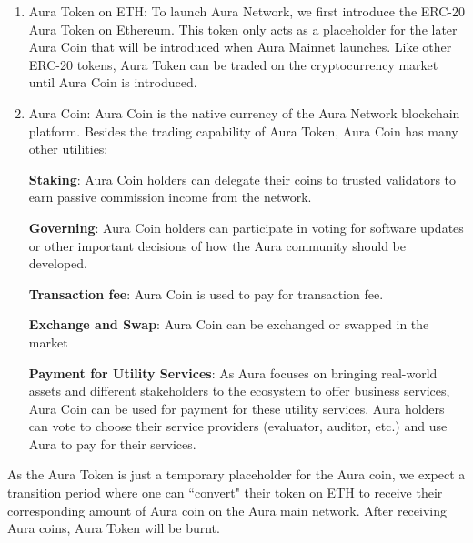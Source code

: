 \documentclass[12pt]{article}
\begin{document}
\begin{enumerate}
    \item Aura Token on ETH: To launch Aura Network, we first introduce the ERC-20 Aura Token on Ethereum. This token only acts as a placeholder for the later Aura Coin that will be introduced when Aura Mainnet launches. Like other ERC-20 tokens, Aura Token can be traded on the cryptocurrency market until Aura Coin is introduced.
    \item Aura Coin: Aura Coin is the native currency of the Aura Network blockchain platform. Besides the trading capability of Aura Token, Aura Coin has many other utilities:

    \textbf{Staking}: Aura Coin holders can delegate their coins to trusted validators to earn passive commission income from the network.
    
    \textbf{Governing}: Aura Coin holders can participate in voting for software updates or other important decisions of how the Aura community should be developed.
    
    \textbf{Transaction fee}: Aura Coin is used to pay for transaction fee.
    
    \textbf{Exchange and Swap}: Aura Coin can be exchanged or swapped in the market
    
    \textbf{Payment for Utility Services}: As Aura focuses on bringing real-world assets and different stakeholders to the ecosystem to offer business services, Aura Coin can be used for payment for these utility services. Aura holders can vote to choose their service providers (evaluator, auditor, etc.) and use Aura to pay for their services.
\end{enumerate}

As the Aura Token is just a temporary placeholder for the Aura coin, we expect a transition period where one can ``convert" their token on ETH to receive their corresponding amount of Aura coin on the Aura main network. After receiving Aura coins, Aura Token will be burnt.
\end{document}
